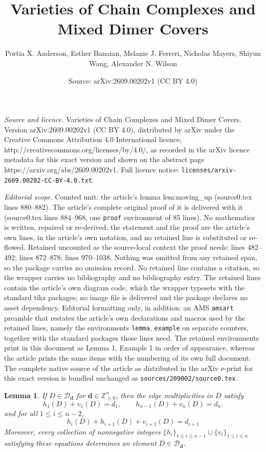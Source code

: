 \documentclass[10pt,a4paper]{amsart}
\title{Varieties of Chain Complexes and Mixed Dimer Covers}
\author{Portia X. Anderson, Esther Banaian, Melanie J. Ferreri, Nicholas Mayers, Shiyun Wang, Alexander N. Wilson}
\date{Source: arXiv:2609.00202v1 (CC BY 4.0)}
\newtheorem{lemma}{Lemma}
\begin{document}
\maketitle

\noindent\emph{Source and licence.} Varieties of Chain Complexes and Mixed Dimer Covers. Version arXiv:2609.00202v1 (CC BY 4.0), distributed by arXiv under the Creative Commons Attribution 4.0 International licence, http://creativecommons.org/licenses/by/4.0/, as recorded in the arXiv licence metadata for this exact version and shown on the abstract page https://arxiv.org/abs/2609.00202v1. Full licence notice: \texttt{licenses/arxiv-2609.00202-CC-BY-4.0.txt}.\par\smallskip

\noindent\textit{Editorial scope.} Counted unit: the article's lemma lem:moving\_up (source0.tex lines 880--882). The article's complete original proof of it is delivered with it (source0.tex lines 884--968, one \texttt{proof} environment of 85 lines). No mathematics is written, repaired or re-derived: the statement and the proof are the article's own lines, in the article's own notation, and no retained line is substituted or re-flowed.  Retained uncounted as the source-local context the proof needs: lines 482--492; lines 872--878; lines 970--1038.  Nothing was omitted from any retained span, so the package carries no omission record.  No retained line contains a citation, so the wrapper carries no bibliography and no bibliography entry.  The retained lines contain the article's own diagram code, which the wrapper typesets with the standard tikz packages; no image file is delivered and the package declares no asset dependency.  Editorial formatting only, in addition: an AMS \texttt{amsart} preamble that restates the article's own declarations and macros used by the retained lines, namely the environments \texttt{lemma}, \texttt{example} on separate counters, together with the standard packages those lines need.  The retained environments print in this document as Lemma 1, Example 1 in order of appearance, whereas the article prints the same items with the numbering of its own full document.  The complete native source of the article as distributed in the arXiv e-print for this exact version is bundled unchanged as \texttt{sources/209002/source0.tex}.
\begin{lemma}\label{lem:VsHsDs}
If $D \in \mathcal{D}_{\mathbf{d}}$ for $\mathbf{d}\in\mathbb{Z}_{\ge 0}^n$, then the edge multiplicities in $D$ satisfy  
\begin{equation*}
 h_1(D) + v_1(D) = d_1, \qquad h_{n-1}(D) + v_n(D) = d_n. \label{}
\end{equation*}
and for all $1 \leq i \leq n-2$,
\begin{equation*}
 h_i(D) + h_{i+1}(D) + v_{i+1}(D) = d_{i+1}
\end{equation*}
Moreover, every collection of nonnegative integers $\{h_i\}_{1 \leq i \leq n-1} \cup \{v_i\}_{1 \leq i \leq n}$ satisfying these equations determines an element  $D \in \mathcal{D}_{\mathbf{d}}$. 
\end{lemma}
\end{document}
